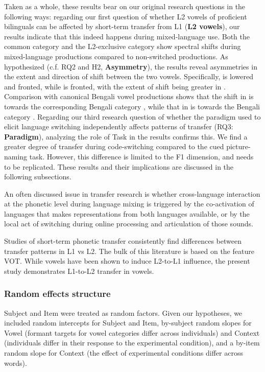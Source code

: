 Taken as a whole, these results bear on our original research questions in the following ways: regarding our first question of whether L2 vowels of proficient bilinguals can be affected by short-term transfer from L1 (\textbf{L2 vowels}), our results indicate that this indeed happens during mixed-language use. Both the common category \nt{\ae} and the L2-exclusive category  show spectral shifts during mixed-language productions compared to non-switched productions. As hypothesized (c.f. RQ2 and H2, \textbf{Asymmetry}), the results reveal asymmetries in the extent and direction of shift between the two vowels. Specifically,  is lowered and fronted, while \nt{\ae} is fronted, with the extent of shift being greater in . Comparison with canonical Bengali vowel productions shows that the shift in \nt{\ae} is towards the corresponding Bengali category \nt{\ae}, while that in  is towards the Bengali category . Regarding our third research question of whether the paradigm used to elicit language switching independently affects patterns of transfer (RQ3: \textbf{Paradigm}), analyzing the role of Task in the results confirms this. We find a greater degree of transfer during code-switching compared to the cued picture-naming task. However, this difference is limited to the F1 dimension, and needs to be replicated. These results and their implications are discussed in the following subsections.


An often discussed issue in transfer research is whether cross-language interaction at the phonetic level during language mixing is triggered by the co-activation of languages that makes representations from both languages available, or by the local act of switching during online processing and articulation of those sounds. 

Studies of short-term phonetic transfer consistently find differences between transfer patterns in L1 vs L2. The bulk of this literature is based on the feature VOT. While vowels have been shown to induce L2-to-L1 influence, the present study demonstrates L1-to-L2 transfer in vowels. 

\subsubsection*{Random effects structure}

Subject and Item were treated as random factors. Given our hypotheses, we included random intercepts for Subject and Item, by-subject random slopes for Vowel (formant targets for vowel categories differ across individuals) and Context (individuals differ in their response to the experimental condition), and a by-item random slope for Context (the effect of experimental conditions differ across words). 

